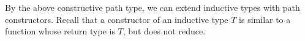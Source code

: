By the above constructive path type,
we can extend inductive types with path constructors.
Recall that a constructor of an inductive type $T$ is
similar to a function whose return type is $T$,
but does not reduce.

\TODO